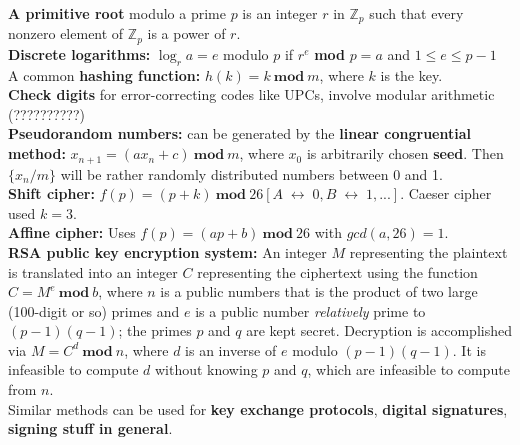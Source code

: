 \documentclass[12pt]{article}
\newcommand{\Z}{\mathbb{Z}}
\renewcommand{\iff}{\;\leftrightarrow\;}
\begin{document}
\textbf{A primitive root} modulo a prime $p$ is an integer $r$ in $\Z_p$ such that every nonzero element of $\Z_p$ is a power of $r$. \\
\textbf{Discrete logarithms:} $\log_r a = e$ modulo $p$ if $r^e$ \textbf{mod} $p = a$ and $1 \leq e \leq p -1$  \\
A common \textbf{hashing function:} $h(k) = k\ \textbf{mod}\ m$, where $k$ is the key. \\
\textbf{Check digits} for error-correcting codes like UPCs, involve modular arithmetic (??????????) \\
\textbf{Pseudorandom numbers:} can be generated by the \textbf{linear congruential method:} $x_{n+1} = (ax_n +c)\ \textbf{mod}\ m$, where $x_0$ is arbitrarily chosen \textbf{seed}. Then $\{x_n/m\}$ will be rather randomly distributed numbers between 0 and 1. \\
\textbf{Shift cipher:} $f(p) = (p + k)\ \textbf{mod}\ 26 [A \iff 0, B \iff 1,...]$. Caeser cipher used $k=3$. \\
\textbf{Affine cipher:} Uses $f(p) = (ap+b)\ \textbf{mod}\ 26$ with $gcd(a,26)=1$. \\
\textbf{RSA public key encryption system:} An integer $M$ representing the plaintext is translated into an integer $C$ representing the ciphertext using the function $C = M^e\ \textbf{mod}\ b$, where $n$ is a public numbers that is the product of two large (100-digit or so) primes and $e$ is a public number \textit{relatively} prime to $(p-1)(q-1)$; the primes $p$ and $q$ are kept secret. Decryption is accomplished via $M=C^d\ \textbf{mod}\ n$, where $d$ is an inverse of $e$ modulo $(p-1)(q-1)$. It is infeasible to compute $d$ without knowing $p$ and $q$, which are infeasible to compute from $n$. \\
Similar methods can be used for \textbf{key exchange protocols}, \textbf{digital signatures}, \textbf{signing stuff in general}. \\
\newpage
\end{document}
